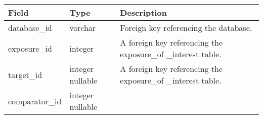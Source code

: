 \documentclass[
]{article}
\begin{document}
\begin{longtable}[]{@{}lll@{}}
\toprule
\begin{minipage}[b]{0.23\columnwidth}\raggedright
Field\strut
\end{minipage} & \begin{minipage}[b]{0.18\columnwidth}\raggedright
Type\strut
\end{minipage} & \begin{minipage}[b]{0.50\columnwidth}\raggedright
Description\strut
\end{minipage}\tabularnewline
\midrule
\endhead
\begin{minipage}[t]{0.23\columnwidth}\raggedright
database\_id\strut
\end{minipage} & \begin{minipage}[t]{0.18\columnwidth}\raggedright
varchar\strut
\end{minipage} & \begin{minipage}[t]{0.50\columnwidth}\raggedright
Foreign key referencing the database.\strut
\end{minipage}\tabularnewline
\begin{minipage}[t]{0.23\columnwidth}\raggedright
exposure\_id\strut
\end{minipage} & \begin{minipage}[t]{0.18\columnwidth}\raggedright
integer\strut
\end{minipage} & \begin{minipage}[t]{0.50\columnwidth}\raggedright
A foreign key referencing the exposure\_of \_interest table.\strut
\end{minipage}\tabularnewline
\begin{minipage}[t]{0.23\columnwidth}\raggedright
target\_id\strut
\end{minipage} & \begin{minipage}[t]{0.18\columnwidth}\raggedright
integer nullable\strut
\end{minipage} & \begin{minipage}[t]{0.50\columnwidth}\raggedright
A foreign key referencing the exposure\_of \_interest table.\strut
\end{minipage}\tabularnewline
\begin{minipage}[t]{0.23\columnwidth}\raggedright
comparator\_id\strut
\end{minipage} & \begin{minipage}[t]{0.18\columnwidth}\raggedright
integer nullable\strut
\end{minipage} & \begin{minipage}[t]{0.50\columnwidth}\raggedright

\end{minipage}
\end{longtable}
\end{document}

